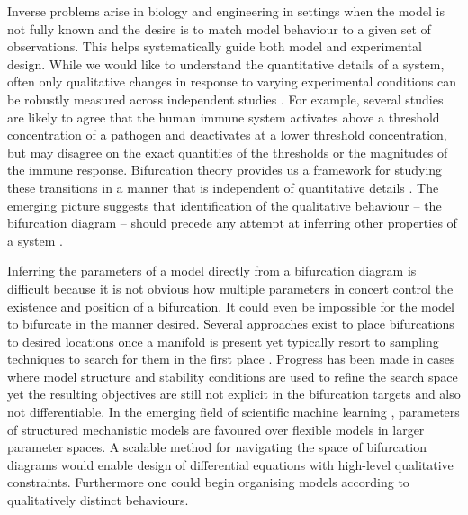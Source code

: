 \documentclass{article}
\begin{document}
Inverse problems \cite{Abdulla2009InverseBiology} arise in biology and engineering in settings when the model is not fully known and the desire is to match model behaviour to a given set of observations. This helps systematically guide both model and experimental design. While we would like to understand the quantitative details of a system, often only qualitative changes in response to varying experimental conditions can be robustly measured across independent studies \cite{Tyson2001NetworkPhysiology,Grant2020InterpretationCircuit}. For example, several studies are likely to agree that the human immune system activates above a threshold concentration of a pathogen and deactivates at a lower threshold concentration, but may disagree on the exact quantities of the thresholds or the magnitudes of the immune response. Bifurcation theory provides us a framework for studying these transitions in a manner that is independent of quantitative details \cite{Kuznetsov2004TopologicalSystems}. The emerging picture suggests that identification of the qualitative behaviour -- the bifurcation diagram -- should precede any attempt at inferring other properties of a system \cite{Stumpf2019ParameterBifurcations}.

Inferring the parameters of a model directly from a bifurcation diagram is difficult because it is not obvious how multiple  parameters in concert control the existence and position of a bifurcation. It could even be impossible for the model to bifurcate in the manner desired. Several approaches exist to place bifurcations to desired locations once a manifold is present \cite{Iwasaki1997AnType,Lu2006InverseSystems,Dobson2004DistanceBifurcations} yet typically resort to sampling techniques to search for them in the first place \cite{Chickarmane2005BifurcationTool,Conrad2006BifurcationClock}. Progress has been made in cases where model structure and stability conditions are used to refine the search space \cite{Otero-Muras2018Optimization-basedModels,Otero-Muras2014ACurves} yet the resulting objectives are still not explicit in the bifurcation targets and also not differentiable. In the emerging field of scientific machine learning \cite{Rackauckas2017Differentialequations.jlJulia,Rackauckas2018ASolutions,Rackauckas2020UniversalLearning}, parameters of structured mechanistic models are favoured over flexible models in larger parameter spaces. A scalable method for navigating the space of bifurcation diagrams would enable design of differential equations with high-level qualitative constraints. Furthermore one could begin organising models according to qualitatively distinct behaviours. 
\end{document}
